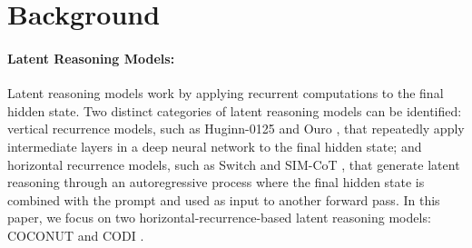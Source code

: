 \documentclass[11pt]{article}
\begin{document}
\section{Background}

\paragraph{Latent Reasoning Models:} Latent reasoning models work by applying recurrent computations to the final hidden state. Two distinct categories of latent reasoning models can be identified: vertical recurrence models, such as Huginn-0125 \cite{geiping2026scaling} and Ouro \cite{zhu2025scaling}, that repeatedly apply intermediate layers in a deep neural network to the final hidden state; and horizontal recurrence models, such as Switch \cite{yang2026demystifying} and SIM-CoT \cite{wei2025sim}, that generate latent reasoning through an autoregressive process where the final hidden state is combined with the prompt and used as input to another forward pass. In this paper, we focus on two horizontal-recurrence-based latent reasoning models: COCONUT \cite{hao2024training} and CODI \cite{shen2025codi}.

\end{document}
